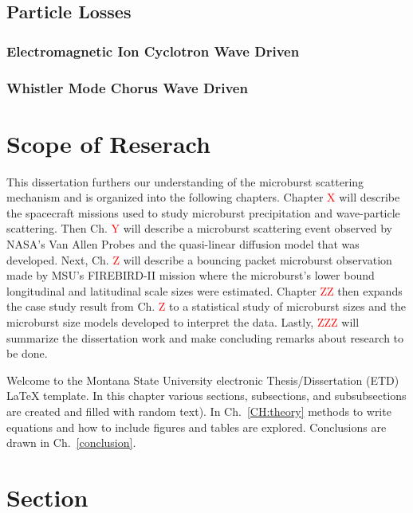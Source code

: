 \subsection{Particle Losses}\label{Intro:acceleration}

\subsubsection{Electromagnetic Ion Cyclotron Wave Driven}\label{Intro:emic_scattering}

\subsubsection{Whistler Mode Chorus Wave Driven}\label{Intro:chorus_scattering}

\section{Scope of Reserach}\label{Intro:scope}
This dissertation furthers our understanding of the microburst scattering mechanism and is organized into the following chapters. Chapter \textcolor{red}{X} will describe the spacecraft missions used to study microburst precipitation and wave-particle scattering. Then Ch. \textcolor{red}{Y} will describe a microburst scattering event observed by NASA's Van Allen Probes and the quasi-linear diffusion model that was developed. Next, Ch. \textcolor{red}{Z} will describe a bouncing packet microburst observation made by MSU's FIREBIRD-II mission where the microburst's lower bound longitudinal and latitudinal scale sizes were estimated. Chapter \textcolor{red}{ZZ} then expands the case study result from Ch. \textcolor{red}{Z} to a statistical study of microburst sizes and the microburst size models developed to interpret the data. Lastly, \textcolor{red}{ZZZ} will summarize the dissertation work and make concluding remarks about research to be done.

\iffalse %
Welcome to the Montana State University electronic Thesis/Dissertation (ETD) \LaTeX{} template.  In this chapter various sections, subsections, and subsubsections are created and filled with random text).  In Ch.~\ref{CH:theory} methods to write equations and how to include figures and tables are explored. Conclusions are drawn in Ch.~\ref{conclusion}.


\section{Section}\label{Sect:test}
\lipsum[1] %

